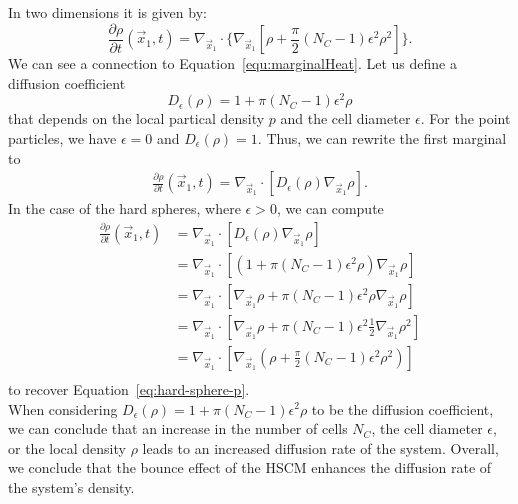 In two dimensions it is given by:
\begin{equation}
    \frac{\partial \rho}{\partial t}(\vec{x}_1, t) = \nabla_{\vec{x}_1} \cdot \{\nabla_{\vec{x}_1}[\rho + \frac{\pi}{2}(N_{C} - 1)\epsilon^2 \rho^2]\}.
    \label{eq:hard-sphere-p}
\end{equation}
We can see a connection to Equation~\ref{equ:marginalHeat}. 
Let us define a diffusion coefficient $$D_{\epsilon}(\rho) = 1 + \pi(N_{C}-1)\epsilon^2 \rho$$ that depends on the local partical density $p$ and the cell diameter $\epsilon$. 
For the point particles, we have $\epsilon = 0$ and $D_{\epsilon}(\rho) = 1$.
Thus, we can rewrite the first marginal to  
\begin{align*}
    \frac{\partial \rho}{\partial t}(\vec{x}_1, t) = \nabla_{\vec{x}_1} \cdot [D_{\epsilon}(\rho) \nabla_{\vec{x}_1} \rho]. 
\end{align*}
In the case of the hard spheres, where $\epsilon > 0$, we can compute
\begin{align*}
    \frac{\partial \rho}{\partial t}(\vec{x}_1, t) &= \nabla_{\vec{x}_1} \cdot [D_{\epsilon}(\rho) \nabla_{\vec{x}_1} \rho] \\  
    &= \nabla_{\vec{x}_1} \cdot [(1 + \pi(N_{C}-1)\epsilon^2 \rho) \nabla_{\vec{x}_1} \rho] \\
    &= \nabla_{\vec{x}_1} \cdot [\nabla_{\vec{x}_1} \rho + \pi(N_{C}-1)\epsilon^2 \rho \nabla_{\vec{x}_1} \rho] \\
    &= \nabla_{\vec{x}_1} \cdot [\nabla_{\vec{x}_1} \rho + \pi(N_{C}-1)\epsilon^2 \frac{1}{2}\nabla_{\vec{x}_1} \rho^2] \\
    &= \nabla_{\vec{x}_1} \cdot [\nabla_{\vec{x}_1} (\rho + \frac{\pi}{2}(N_{C}-1)\epsilon^2 \rho^2)] \\
\end{align*}
to recover Equation~\ref{eq:hard-sphere-p}. \\ 
When considering \( D_\epsilon(\rho) = 1 + \pi(N_{C}-1)\epsilon^2 \rho \) to be the diffusion coefficient, we can conclude that an increase in the number of cells \( N_{C} \), the cell diameter \( \epsilon \), or the local density \( \rho \) leads to an increased diffusion rate of the system.
Overall, we conclude that the bounce effect of the HSCM enhances the diffusion rate of the system's density.

